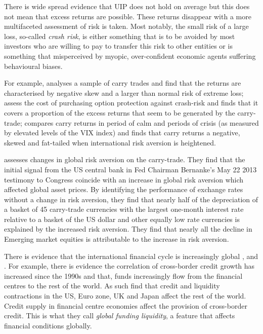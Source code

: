 \documentclass[12pt, a4paper, oneside]{article} %
\begin{document}
There is wide spread evidence that UIP does not hold on average but this does not mean that excess returns are possible.  These returns disappear with a more multifaceted assessment of risk is taken.  Most notably, the small risk of a large loss, so-called \emph{crash risk}, is either something that is to be avoided by most investors who are willing to pay to transfer this risk to other entities or is something that misperceived by myopic, over-confident economic agents suffering behavioural biases.  

For example, \citet{BrunnermeierCarry} analyses a sample of carry trades and find that the returns are characterised by negative skew and a larger than normal risk of extreme loss; \citet{JurekCrash} assess the cost of purchasing option protection against crash-risk and finds that it covers a proportion of the excess returns that seem to be generated by the carry-trade; \citet{Hayward2013} compares carry returns in period of calm and periods of crisis (as measured by elevated levels of the VIX index) and finds that carry returns a negative, skewed and fat-tailed when international risk aversion is heightened.  

 
\citet{NYFedtaper} assesses changes in global risk aversion on the carry-trade.  They find that the initial signal from the US central bank in Fed Chairman Bernanke's May 22 2013 testimony to Congress coincide with an increase in global risk aversion which affected global asset prices. %
By identifying the performance of exchange rates without a change in risk aversion, they find that nearly half of the depreciation of a basket of 45 carry-trade currencies with the largest one-month interest rate relative to a basket of the US dollar and other equally low rate currencies is explained by the increased risk aversion. They find that nearly all the decline in Emerging market equities is attributable to the increase in risk aversion.

There is evidence that the international financial cycle is increasingly global \citet{Rey2013}, \citet{Obstfeld2013} and \citet{Bruno2014}.  %
For example, there is evidence the correlation of cross-border credit growth has increased since the 1990s and that, funds increasingly flow from the financial centres to the rest of the world. As such \citet{Cerutti2014} find that credit and liquidity contractions in  the US, Euro zone, UK and Japan affect the rest of the world. Credit supply in financial centre economies affect the provision of cross-border credit.  This is what they call \emph{global funding liquidity}, a feature that affects financial conditions globally. 
\end{document}
